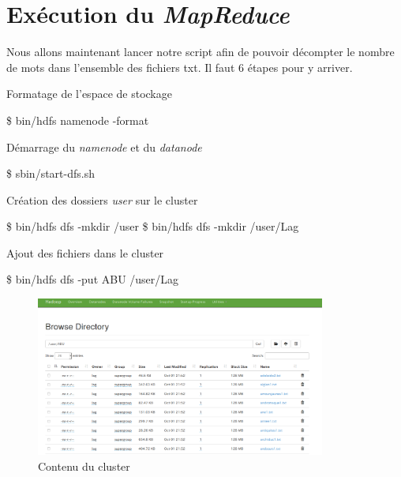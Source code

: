 \documentclass{article}
\begin{document}
\section{Ex\'{e}cution du \textit{MapReduce}}

Nous allons maintenant lancer notre script afin de pouvoir d\'{e}compter le nombre de mots dans l'ensemble des fichiers txt. Il faut 6 \'{e}tapes pour y arriver.

\begin{enumerate}
\begin{item}
Formatage de l'espace de stockage
\begin{tcolorbox}
\$ bin/hdfs namenode -format
\end{tcolorbox}
\end{item}
\begin{item}
D\'{e}marrage du \textit{namenode} et du \textit{datanode}
\begin{tcolorbox}
\$ sbin/start-dfs.sh
\end{tcolorbox}
\end{item}
\begin{item}
Cr\'{e}ation des dossiers \textit{user} sur le cluster
\begin{tcolorbox}
\$ bin/hdfs dfs -mkdir /user
\$ bin/hdfs dfs -mkdir /user/Lag
\end{tcolorbox}
\end{item}
\begin{item}
Ajout des fichiers dans le cluster
\begin{tcolorbox}
\$ bin/hdfs dfs -put ABU /user/Lag
\end{tcolorbox}

\begin{figure}[h]
\begin{center}
\includegraphics[width=0.85\textwidth]{insideDatanode}
\caption{Contenu du cluster}
\label{fig:datanodeContent}
\end{center}
\end{figure}


\end{item}
\end{enumerate}
\end{document}
